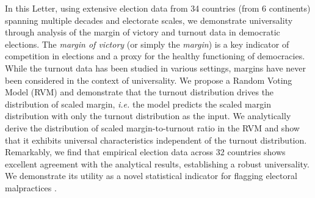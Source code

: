 \documentclass[reprint,aps,prl,showpacs,twocolumn, superscriptaddress]{revtex4-2}
\begin{document}
In this Letter, using extensive election data \cite{india_data, clea, canada_data, DVN/VOQCHQ_2018} from 34 countries (from 6 continents) spanning multiple decades and electorate scales, we demonstrate universality through analysis of the margin of victory and turnout data in democratic elections. The \emph{margin of victory} (or simply the \emph{margin}) is a key indicator of competition in elections and a proxy for the healthy functioning of democracies. While the turnout data has been studied in various settings, margins have never been considered in the context of universality. We propose a Random Voting Model (RVM) and demonstrate that the turnout distribution drives the distribution of scaled margin, {\it i.e.} the model predicts the scaled margin distribution with only the turnout distribution as the input. We analytically derive the distribution of scaled margin-to-turnout ratio in the RVM and show that it exhibits universal characteristics independent of the turnout distribution. Remarkably, we find that empirical election data across 32 countries shows excellent agreement with the analytical results, establishing a robust universality. We demonstrate its utility as a novel statistical indicator for flagging electoral malpractices \cite{klimek2012statistical, jimenez2017testing}.
\end{document}
